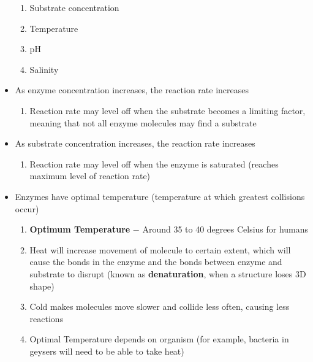 \documentclass[12pt]{article}
\begin{document}
\begin{itemize}
\begin{enumerate}
      \item Substrate concentration

      \item Temperature

      \item pH

      \item Salinity

    \end{enumerate}

  \item As enzyme concentration increases, the reaction rate increases

    \begin{enumerate}

      \item Reaction rate may level off when the substrate becomes a limiting factor, meaning that not all enzyme molecules may find a substrate

    \end{enumerate}

  \item As substrate concentration increases, the reaction rate increases

    \begin{enumerate}

      \item Reaction rate may level off when the enzyme is saturated (reaches maximum level of reaction rate)

    \end{enumerate}

  \item Enzymes have optimal temperature (temperature at which greatest collisions occur)

    \begin{enumerate}

      \item \textbf{Optimum Temperature} $-$ Around 35 to 40 degrees Celsius for humans

      \item Heat will increase movement of molecule to certain extent, which will cause the bonds in the enzyme and the bonds between enzyme and substrate to disrupt (known as \textbf{denaturation}, when a structure loses 3D shape)

      \item Cold makes molecules move slower and collide less often, causing less reactions

      \item Optimal Temperature depends on organism (for example, bacteria in geysers will need to be able to take heat)


\end{enumerate}
\end{itemize}
\end{document}
